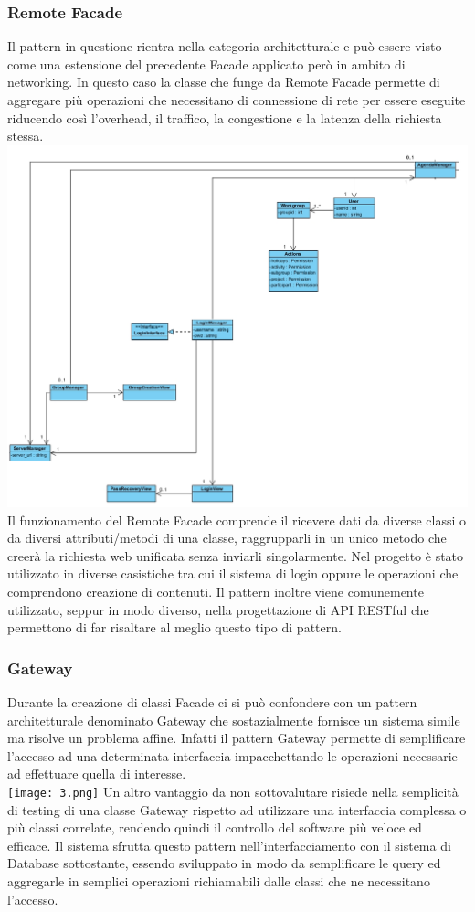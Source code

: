 \documentclass[12pt]{scrartcl}
\begin{document}
\subsubsection{Remote Facade}
Il pattern in questione rientra nella categoria architetturale e pu\`o
essere visto come una estensione del precedente Facade applicato per\`o
in ambito di networking. In questo caso la classe che funge da Remote
Facade permette di aggregare pi\`u operazioni che necessitano di connessione
di rete per essere eseguite riducendo cos\`i l'overhead, il traffico,
la congestione e la latenza della richiesta stessa.\\
    \includegraphics[scale=0.40]{2.png}
Il funzionamento del Remote Facade comprende il ricevere dati da diverse
classi o da diversi attributi/metodi di una classe, raggrupparli in un unico
metodo che creer\`a la richiesta web unificata senza inviarli singolarmente.
Nel progetto \`e stato utilizzato in diverse casistiche tra cui il sistema
di login oppure le operazioni che comprendono creazione di contenuti.
Il pattern inoltre viene comunemente utilizzato, seppur in modo diverso,
nella progettazione di API RESTful che permettono di far risaltare al meglio
questo tipo di pattern.

\subsubsection{Gateway}
Durante la creazione di classi Facade ci si pu\`o confondere con un pattern
architetturale denominato Gateway che sostazialmente fornisce un sistema
simile ma risolve un problema affine. Infatti il pattern Gateway permette
di semplificare l'accesso ad una determinata interfaccia impacchettando le operazioni
necessarie ad effettuare quella di interesse. \\
    \texttt{[image: 3.png]}
Un altro vantaggio da non sottovalutare risiede nella semplicit\`a di testing
di una classe Gateway rispetto ad utilizzare una interfaccia complessa o pi\`u
classi correlate, rendendo quindi il controllo del software pi\`u veloce ed efficace.
Il sistema sfrutta questo pattern nell'interfacciamento con il sistema di Database
sottostante, essendo sviluppato in modo da semplificare le query ed aggregarle in
semplici operazioni richiamabili dalle classi che ne necessitano l'accesso.
\end{document}
